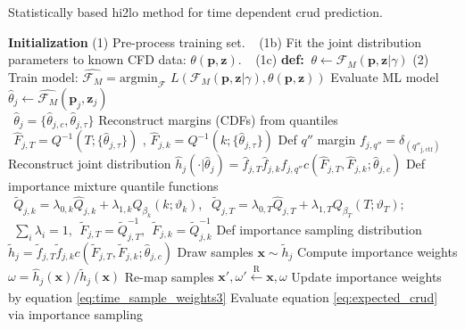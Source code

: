 \begin{algorithm}[H]
    \caption{Statistically based hi2lo method for time dependent crud prediction.}
    \begin{algorithmic}      
        \STATE \textbf{Initialization}  
        \STATE (1) Pre-process training set.  
        \STATE $\ \ $   (1b) Fit the joint distribution parameters to known CFD data: $\theta(\mathbf p, \mathbf z)$.  
        \STATE $\ \ $   (1c) \textbf{def:}  $\ \theta \leftarrow \mathcal F_M(\mathbf p, \mathbf z | \gamma)$
        \STATE (2) Train model:  $\hat{\mathcal F_M} =  \mathrm{argmin}_{\mathcal F}$
        $L(\mathcal{F}_M (\mathbf p, \mathbf z| \gamma), \theta(\mathbf p, \mathbf z)) $
          \STATE Evaluate ML model $\hat \theta_j \leftarrow \hat{\mathcal F_M}(\mathbf p_j, \mathbf z_j)$ \\
               $\ \ \hat \theta_j = \{\hat \theta_{j,c}, \hat \theta_{j,\tau} \}$
          \STATE Reconstruct margins (CDFs) from quantiles  \\
            $\ \ \hat F_{j,T}= Q^{-1}(T; \{\hat{\theta}_{j,\tau} \})$ , $\hat F_{j,k}= Q^{-1}(k; \{\hat{\theta}_{j,\tau} \})$
          \STATE Def $q''$ margin  $f_{j,q''} = \delta_{(q''_\mathrm{j,ctf})}$
          \STATE Reconstruct joint distribution $\hat h_j(\cdot |\hat \theta_j) = \hat f_{j,T} \hat f_{j,k} f_{j,q''} c(\hat F_{j,T}, \hat F_{j,k}; \hat \theta_{j,c})$ \;
        \ENDFOR
              \STATE Def importance  mixture quantile functions \\
                $\ \ \tilde Q_{j,k} = \lambda_{0,k} \hat Q_{j,k}  + \lambda_{1,k} Q_{\beta_k}(k; \vartheta_k)$, 
                $\ \ \tilde Q_{j,T} = \lambda_{0,T} \hat Q_{j,T}  + \lambda_{1,T} Q_{\beta_T}(T; \vartheta_T); $ \\
                $\ \ \sum_i \lambda_i = 1, \ \ \tilde F_{j,T} = \tilde Q^{-1}_{j,T},\ \  \tilde F_{j,k} = \tilde Q^{-1}_{j,k} $
              \STATE Def importance sampling distribution $\tilde h_j = \tilde f_{j,T} \tilde f_{j,k} c(\tilde F_{j,T}, \tilde F_{j,k}; \hat \theta_{j,c}) $
              \STATE Draw samples $\mathbf x \sim \tilde h_j$ \;
              \STATE Compute importance weights $\omega = \hat h_j(\mathbf x) /  \tilde h_j(\mathbf x) $
              \STATE Re-map samples  $\mathbf x', \omega' \xleftarrow[\text{ }]{\text{R}} \mathbf x, \omega $
              \STATE Update importance weights by equation \ref{eq:time_sample_weights3}
              \STATE Evaluate equation \ref{eq:expected_crud} via importance sampling \;
          \ENDFOR
        \ENDFOR
        \ENDFOR
    \end{algorithmic}
    \label{algo:hi2lo_crud_algo}
\end{algorithm}

